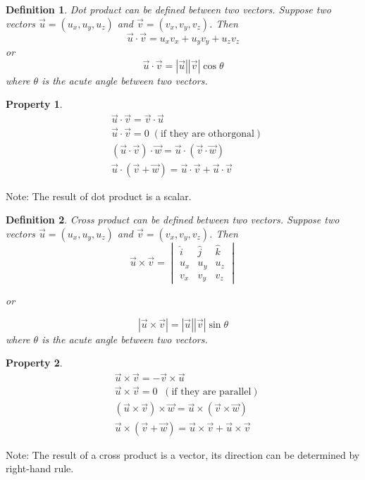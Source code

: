 \documentclass{article}
\newtheorem{definition}{Definition}
\newtheorem*{property}{Property}
\begin{document}
\begin{definition}
	Dot product can be defined between two vectors. Suppose two vectors $\vec{u}=(u_x,u_y,u_z)$ and $\vec{v}=(v_x,v_y,v_z)$. Then
	\[ \vec{u}\cdot\vec{v} = u_xv_x + u_yv_y + u_zv_z \]
	or 
	\[ \vec{u}\cdot\vec{v} = |\vec{u}||\vec{v}|\cos\theta \]
	where $\theta$ is the acute angle between two vectors.
\end{definition}

\begin{property}
	\begin{align}
	&\vec{u}\cdot\vec{v} = \vec{v}\cdot\vec{u}\\
	&\vec{u}\cdot\vec{v} = 0 \;(\text{if they are othorgonal})\\
	&(\vec{u}\cdot\vec{v})\cdot\vec{w} = \vec{u}\cdot(\vec{v}\cdot\vec{w})\\
	&\vec{u}\cdot(\vec{v}+\vec{w}) = \vec{u}\cdot\vec{v} + \vec{u}\cdot\vec{v}
	\end{align}
\end{property}

Note: The result of dot product is a scalar.

\begin{definition}
	Cross product can be defined between two vectors. Suppose two vectors $\vec{u}=(u_x,u_y,u_z)$ and $\vec{v}=(v_x,v_y,v_z)$. Then
	\[ \vec{u}\times\vec{v} = \begin{vmatrix}
	\hat{i} & \hat{j} & \hat{k}\\ u_x&u_y&u_z\\ v_x&v_y&v_z
	\end{vmatrix} \]
	
	or
	
	\[ |\vec{u}\times\vec{v}| = |\vec{u}||\vec{v}|\sin\theta \]
	where $\theta$ is the acute angle between two vectors.
\end{definition}

\begin{property}
	\begin{align}
	&\vec{u}\times\vec{v} = -\vec{v}\times\vec{u}\\
	&\vec{u}\times\vec{v} = 0\;\;(\text{if they are parallel})\\
	&(\vec{u}\times\vec{v})\times\vec{w} = \vec{u}\times(\vec{v}\times\vec{w})\\
	&\vec{u}\times(\vec{v} + \vec{w}) = \vec{u}\times\vec{v} + \vec{u}\times\vec{v}
	\end{align}
	
\end{property}

Note: The result of a cross product is a vector, its direction can be determined by right-hand rule.
\end{document}
